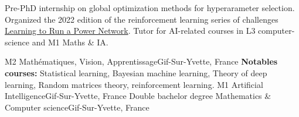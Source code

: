 \documentclass[
    10pt,
    A4,
    english,
    draft = false,
    twoside = false,
]{article}
\begin{document}
	
	
	{Pre-PhD internship on global optimization methods for hyperarameter selection.}
	{Organized the 2022 edition of the reinforcement learning series of challenges
	   \href{https://l2rpn.chalearn.org/}{Learning to Run a Power Network}.}
	{Tutor for AI-related courses in L3 computer-science and M1 Maths \& IA.}
	
	
	{M2 Mathématiques, Vision, Apprentissage}{Gif-Sur-Yvette, France}
	{{\bf Notables courses:} Statistical learning, Bayesian machine learning, Theory of deep learning,
	Random matrices theory, reinforcement learning.}
	{M1 Artificial Intelligence}{Gif-Sur-Yvette, France}
	{}
	{Double bachelor degree Mathematics \& Computer science}{Gif-Sur-Yvette,
	France}
	{}
	
\end{document}
